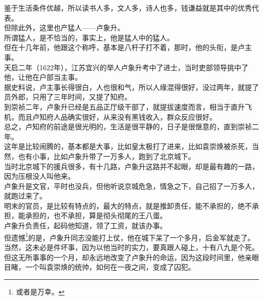\begin{multicols}{\theparacolNo}
鉴于生活条件优越，所以读书人多，文人多，诗人也多，钱谦益就是其中的优秀代表。\\

但除此外，这里也产猛人——卢象升。\\

所谓猛人，是不恰当的，事实上，他是猛人中的猛人。\\

但在十几年前，他跟这个称呼，基本是八杆子打不着，那时，他的头衔，是卢主事。\\

天启二年（1622年），江苏宜兴的举人卢象升考中了进士，当时吏部领导挑中了他，让他在户部当主事。\\

据史料说，卢主事长得很白，人也很和气，所以人缘混得很好，没过两年，就提了员外郎，只用了三年时间，又提了知府。\\

到崇祯二年，卢象升已经是五品正厅级干部了，就提拔速度而言，相当于直升飞机，而且卢知府人品确实很好，从来没有黑钱收入，群众反应很好。\\

总之，卢知府的前途是很光明的，生活是很平静的，日子是很惬意的，直到崇祯二年。\\

这年是比较闹腾的，基本都是大事，比如皇太极打了进来，比如袁崇焕被杀死，当然，也有小事，比如卢象升带了一万多人，跑到了北京城下。\\

当时北京城下的援兵很多，有十几路，卢象升这路并不起眼，却是最有趣的一路，因为压根没人叫他来。\\

卢象升是文官，平时也没兵，但他听说京城危急，情急之下，自己招了一万多人，就跑过来了。\\

明末的官员，是比较有特点的，最大的特点，就是推卸责任，能不承担的，绝不承担，能承担的，也不承担，算是彻头彻尾的王八蛋。\\

卢象升负责任，起码他知道，领了工资，就该办事。\\

但遗憾\footnote{或者是万幸。}的是，卢象升同志没能打上仗，他在城下呆了一个多月，后金军就走了。\\

当然，这未必是件坏事，因为以他当时的实力，要真跟人碰上，十有八九是个死。\\

但这无所事事的一个月，却永远地改变了卢象升的命运，因为这段时间里，他亲眼目睹，一个叫袁崇焕的统帅，如何在一夜之间，变成了囚犯。\\


\end{multicols}
